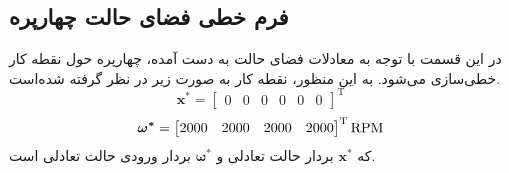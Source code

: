 \subsection{فرم خطی فضای حالت چهارپره}\label{lin_MIMO}
در این قسمت با توجه به معادلات فضای حالت به دست آمده، چهارپره حول نقطه کار خطی‌سازی می‌شود. به این منظور، نقطه کار به صورت زیر در نظر گرفته شده‌است.
\begin{equation}
	\boldsymbol{x^*} = \begin{bmatrix} %
		0& 0 & 0 & 0& 0& 0
	\end{bmatrix}^\mathrm{T}
\end{equation}
\begin{equation}
	\boldsymbol{\omega^*} = \begin{bmatrix}
		2000&2000&2000&2000
	\end{bmatrix}^\mathrm{T}\rm{RPM}
\end{equation}
که $\boldsymbol{x^*}$ بردار حالت تعادلی و $\boldsymbol{\omega^*}$ بردار ورودی حالت تعادلی است.
